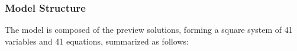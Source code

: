 \documentclass[
thesis.tex
]{subfiles}
\begin{document}
\begin{comment}
	Define the total demand $Y_{t}$ and the regional demands $Y_{\eta}$:
	\begin{align}
		Y_{t} &= Y_{1 t} + Y_{2 t} \label{eq:reg-total-demand} \\
		& \text{where:} \quad Y_{\eta t} = C_{\eta 1 t} + C_{\eta 2 t} + I_{\eta t} 
	\end{align}
	
	The market clearing conditions are:
\end{comment}



\subsubsection{Model Structure}

The model is composed of the preview solutions, forming a square system of 41 variables and 41 equations, summarized as follows:
\end{document}
